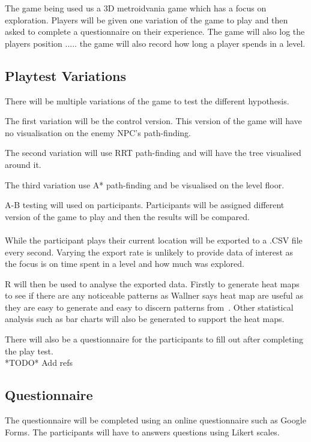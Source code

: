 \documentclass[journal]{IEEEtran}
\begin{document}
The game being used us a 3D metroidvania game which has a focus on exploration. Players will be given one variation of the game to play and then asked to complete a questionnaire on their experience. The game will also log the players position .....
the game will also record how long a player spends in a level.  

\subsection{Playtest Variations}
There will be multiple variations of the game to test the different hypothesis. 

The first variation will be the control version. This version of the game will have no visualisation on the enemy NPC's path-finding.

The second variation will use RRT path-finding and will have the tree visualised around it. 

The third variation use A* path-finding and be visualised on the level floor. 

A-B testing will used on participants. Participants will be assigned different version of the game to play and then the results will be compared. \\
\\
While the participant plays their current location will be exported to a .CSV file every second. Varying the export rate is unlikely to provide data of interest as the focus is on time spent in a level and how much was explored. 

R will then be used to analyse the exported data. Firstly to generate heat maps to see if there are any noticeable patterns as Wallner says heat map are useful as they are easy to generate and easy to discern patterns from~\cite{Wallner2015}. 
Other statistical analysis such as  bar charts will also be generated to support the heat maps.
 
There will also be a questionnaire for the participants to fill out after completing the play test.\\

*TODO* Add refs

\subsection{Questionnaire}
The questionnaire will be completed using an online questionnaire such as Google Forms. The participants will have to answers questions using Likert scales.
\end{document}

